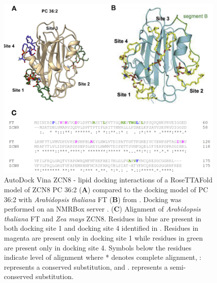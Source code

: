 \documentclass[9pt,twocolumn,twoside,lineno]{biorxiv}
\begin{document}
\clearpage

\begin{figure}[t]
\begin{center}
\includegraphics[width=0.8 \paperwidth]{Sup_Figures/Sup_Fig_12.png}
\caption{ AutoDock Vina \cite{Trott2010-su} ZCN8 - lipid docking interactions of a RoseTTAFold \cite{baek2021sci} model of ZCN8 PC 36:2 (\textbf{A}) compared to the docking model of PC 36:2 with \textit{Arabidopsis thaliana} FT (\textbf{B}) from \cite{Nakamura2019-ht}. Docking was performed on an NMRBox server \cite{maciejewski2010bj}.
(\textbf{C}) Alignment of \textit{Arabidopsis thaliana} FT and \textit{Zea mays} ZCN8. 
Residues in blue are present in both docking site 1 and docking site 4 identified in \cite{Nakamura2019-ht}. 
Residues in magenta are present only in docking site 1 while residues in green are present only in docking site 4. 
Symbols below the residues indicate level of alignment where * denotes complete alignment, : represents a conserved substitution, and . represents a semi-conserved substitution.}
\label{figure:Sup:Docking}
\end{center}
\end{figure} 
\end{document}

